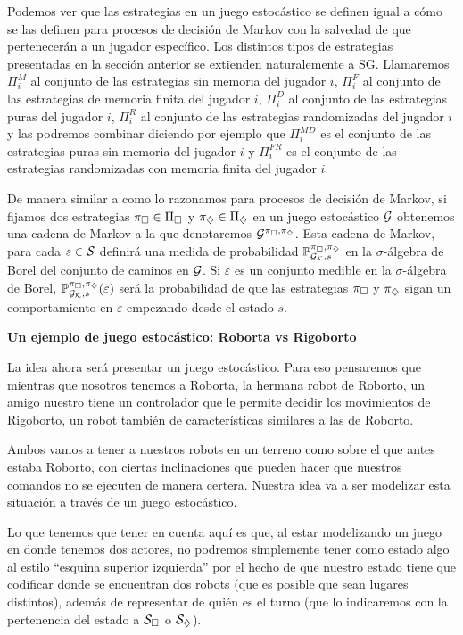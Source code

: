 Podemos ver que las estrategias en un juego estocástico se definen igual a cómo
se las definen para procesos de decisión de Markov con la salvedad de que
pertenecerán a un jugador específico. Los distintos tipos de estrategias
presentadas en la sección anterior se extienden naturalemente a SG. Llamaremos
$\Pi^{M}_i$ al conjunto de las estrategias sin memoria del jugador $i$,
$\Pi^{F}_i$ al conjunto de las estrategias de memoria finita del jugador $i$,
$\Pi^{D}_i$ al conjunto de las estrategias puras del jugador $i$, $\Pi^{R}_i$
al conjunto de las estrategias randomizadas del jugador $i$ y las podremos
combinar diciendo por ejemplo que $\Pi^{MD}_i$ es el conjunto de las
estrategias puras sin memoria del jugador $i$ y $\Pi^{FR}_i$ es el conjunto de
las estrategias randomizadas con memoria finita del jugador $i$.

De manera similar a como lo razonamos para procesos de decisión de Markov, si
fijamos dos estrategias $\pi_\square \in \Pi_\square$ y $\pi_\diamondsuit \in \Pi_\diamondsuit$
en un juego estocástico $\mathcal{G}$ obtenemos una cadena de Markov a la que
denotaremos $\mathcal{G}^{\pi_\square, \pi_\diamondsuit}$. Esta cadena de Markov, para cada $s \in
	\mathcal{S}$ definirá una medida de probabilidad $\mathbb{P}_{\mathcal{G}_{\mathcal{K}}, s}^{\pi_\square, \pi_\diamondsuit}$ en la $\sigma$-álgebra de
Borel del conjunto de caminos en $\mathcal{G}$. Si $\varepsilon$ es un conjunto medible
en la $\sigma$-álgebra de Borel, $\mathbb{P}_{\mathcal{G}_{\mathcal{K}}, s}^{\pi_\square, \pi_\diamondsuit}(\varepsilon)$ será la probabilidad de
que las estrategias $\pi_\square$ y $\pi_\diamondsuit$ sigan un comportamiento en
$\varepsilon$ empezando desde el estado $s$.

\textbf{Un ejemplo de juego estocástico: Roborta vs Rigoborto}

La idea ahora será presentar un juego estocástico. Para eso pensaremos que
mientras que nosotros tenemos a Roborta, la hermana robot de Roborto, un amigo
nuestro tiene un controlador que le permite decidir los movimientos de
Rigoborto, un robot también de características similares a las de Roborto.

Ambos vamos a tener a nuestros robots en un terreno como sobre el que antes
estaba Roborto, con ciertas inclinaciones que pueden hacer que nuestros
comandos no se ejecuten de manera certera. Nuestra idea va a ser modelizar esta
situación a través de un juego estocástico.

Lo que tenemos que tener en cuenta aquí es que, al estar modelizando un juego
en donde tenemos dos actores, no podremos simplemente tener como estado algo al
estilo ``esquina superior izquierda'' por el hecho de que nuestro estado tiene
que codificar donde se encuentran dos robots (que es posible que sean lugares
distintos), además de representar de quién es el turno (que lo indicaremos con
la pertenencia del estado a $\mathcal{S}_\square$ o $\mathcal{S}_\diamondsuit$).

